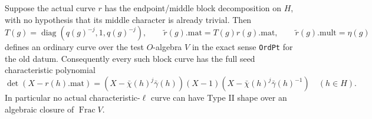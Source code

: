 \begin{proposition}
\label{AC-G60}
Suppose the actual curve \(r\) has the endpoint/middle
block decomposition on \(H\), with no hypothesis that
its middle character is already trivial.
Then
\[
 T(g)=\operatorname{diag}(q(g)^{-j},1,q(g)^{-j}),\qquad
 \widetilde r(g).\mathrm{mat}=T(g)r(g).\mathrm{mat},\qquad
 \widetilde r(g).\mathrm{mult}=\eta(g)
 \tag{G60.3}
\]
defines an ordinary curve over the test \(O\)-algebra
\(V\) in the exact sense \texttt{OrdPt} for the old datum.
Consequently every such block curve has the full seed
characteristic polynomial
\[
 \det(X-r(h).\mathrm{mat})
  =(X-\bar\chi(h)^j\bar\gamma(h))(X-1)
    (X-\bar\chi(h)^j\bar\gamma(h)^{-1})
       \quad(h\in H).
 \tag{G60.4}
\]
In particular no actual characteristic-\(\ell\) curve can
have Type II shape over an algebraic closure of
\(\operatorname{Frac}V\).
\end{proposition}
